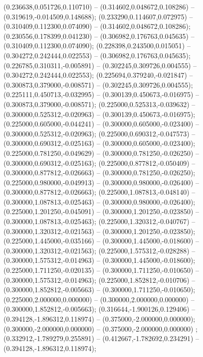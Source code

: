  (0.236638,0.051726,0.110710) -- (0.314602,0.048672,0.108286) -- (0.319619,-0.014509,0.148688);
 (0.233290,0.114607,0.072975) -- (0.310409,0.112300,0.074090) -- (0.314602,0.048672,0.108286);
 (0.230556,0.178399,0.041230) -- (0.306982,0.176763,0.045635) -- (0.310409,0.112300,0.074090);
 (0.228398,0.243500,0.015051) -- (0.304272,0.242444,0.022553) -- (0.306982,0.176763,0.045635);
 (0.226785,0.310311,-0.005891) -- (0.302245,0.309726,0.004555) -- (0.304272,0.242444,0.022553);
 (0.225694,0.379240,-0.021847) -- (0.300873,0.379000,-0.008571) -- (0.302245,0.309726,0.004555);
 (0.225111,0.450713,-0.032995) -- (0.300139,0.450673,-0.016975) -- (0.300873,0.379000,-0.008571);
 (0.225000,0.525313,-0.039632) -- (0.300000,0.525312,-0.020963) -- (0.300139,0.450673,-0.016975);
 (0.225000,0.605000,-0.044241) -- (0.300000,0.605000,-0.023400) -- (0.300000,0.525312,-0.020963);
 (0.225000,0.690312,-0.047573) -- (0.300000,0.690312,-0.025163) -- (0.300000,0.605000,-0.023400);
 (0.225000,0.781250,-0.049629) -- (0.300000,0.781250,-0.026250) -- (0.300000,0.690312,-0.025163);
 (0.225000,0.877812,-0.050409) -- (0.300000,0.877812,-0.026663) -- (0.300000,0.781250,-0.026250);
 (0.225000,0.980000,-0.049913) -- (0.300000,0.980000,-0.026400) -- (0.300000,0.877812,-0.026663);
 (0.225000,1.087813,-0.048140) -- (0.300000,1.087813,-0.025463) -- (0.300000,0.980000,-0.026400);
 (0.225000,1.201250,-0.045091) -- (0.300000,1.201250,-0.023850) -- (0.300000,1.087813,-0.025463);
 (0.225000,1.320312,-0.040767) -- (0.300000,1.320312,-0.021563) -- (0.300000,1.201250,-0.023850);
 (0.225000,1.445000,-0.035166) -- (0.300000,1.445000,-0.018600) -- (0.300000,1.320312,-0.021563);
 (0.225000,1.575312,-0.028288) -- (0.300000,1.575312,-0.014963) -- (0.300000,1.445000,-0.018600);
 (0.225000,1.711250,-0.020135) -- (0.300000,1.711250,-0.010650) -- (0.300000,1.575312,-0.014963);
 (0.225000,1.852812,-0.010706) -- (0.300000,1.852812,-0.005663) -- (0.300000,1.711250,-0.010650);
 (0.225000,2.000000,0.000000) -- (0.300000,2.000000,0.000000) -- (0.300000,1.852812,-0.005663);
 (0.316644,-1.900126,0.129406) -- (0.394128,-1.896312,0.118974) -- (0.375000,-2.000000,0.000000);
 (0.300000,-2.000000,0.000000) -- (0.375000,-2.000000,0.000000) ;
 (0.332912,-1.789279,0.255891) -- (0.412667,-1.782692,0.234291) -- (0.394128,-1.896312,0.118974);

